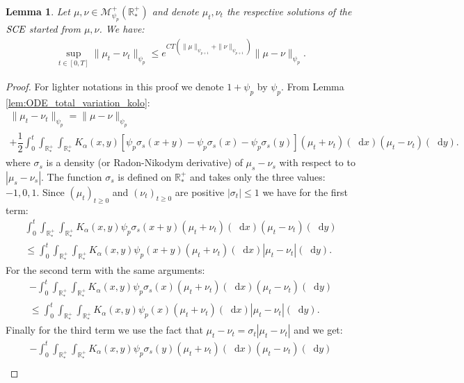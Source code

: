 \documentclass[11pt,a4paper]{article}
\newcommand{\RRP}{\mathbb{R}^+_*}
\newcommand{\MC}{\mathcal{M}}
\newcommand{\SCE}{\emph{SCE}}
\newcommand{\Proc}[1]{\left(#1\right)_{t\geq 0}}
\newcommand{\dd}{\mathop{}\!\mathrm{d}}
\newtheorem{lemma}[theorem]{Lemma}
\begin{document}
\begin{lemma}\label{lem:Lip-smol-TV}
    Let $\mu,\nu \in \MC^+_{\psi_p}(\RRP)$ and denote $\mu_t,\nu_t$ the respective solutions of the $\SCE$ started from $\mu,\nu$. We have:
    \begin{align*}
        \sup\limits_{t \in [0,T]}\| \mu_t - \nu_t\|_{\psi_p} \leq e^{CT\left(\|\mu\|_{\psi_{p+1}} + \|\nu\|_{\psi_{p+1}}\right)}\|\mu- \nu\|_{\psi_p}.
    \end{align*}
\end{lemma}
\begin{proof}
    For lighter notations in this proof we denote $1 + \psi_p$ by $\psi_p$. From Lemma \ref{lem:ODE_total_variation_kolo}:
    \begin{multline*}
        \| \mu_t - \nu_t\|_{\psi_p} = \|\mu- \nu\|_{\psi_p} \\
        + \dfrac12\int_0^t \int_{\RRP}\int_{\RRP} K_\alpha(x,y) \left[\psi_p\sigma_s(x+y) - \psi_p\sigma_s(x) - \psi_p\sigma_s(y) \right]\left(\mu_t + \nu_t\right)(\dd x) \left(\mu_t - \nu_t\right)(\dd y).
    \end{multline*}
    where $\sigma_s$ is a density (or Radon-Nikodym derivative) of $\mu_s - \nu_s$ with respect to to $|\mu_s - \nu_s|$. The function $\sigma_s$ is defined on $\RRP$ and takes only the three values: $-1,0,1$. Since $\Proc{\mu_t}$ and $\Proc{\nu_t}$ are positive $|\sigma_t| \leq 1$ we have for the first term:
    \begin{multline*}
        \int_0^t \int_{\RRP}\int_{\RRP} K_\alpha(x,y) \psi_p\sigma_s(x+y)\left(\mu_t + \nu_t\right)(\dd x) \left(\mu_t - \nu_t\right)(\dd y) \\
        \leq \int_0^t \int_{\RRP}\int_{\RRP} K_\alpha(x,y) \psi_p(x+y)\left(\mu_t + \nu_t\right)(\dd x) \left|\mu_t - \nu_t\right|(\dd y) .
    \end{multline*}
    For the second term with the same arguments:
    \begin{multline*}
        -\int_0^t \int_{\RRP}\int_{\RRP} K_\alpha(x,y) \psi_p\sigma_s(x)\left(\mu_t + \nu_t\right)(\dd x) \left(\mu_t - \nu_t\right)(\dd y) \\
        \leq \int_0^t \int_{\RRP}\int_{\RRP} K_\alpha(x,y) \psi_p(x)\left(\mu_t + \nu_t\right)(\dd x) \left|\mu_t - \nu_t\right|(\dd y).
    \end{multline*}
    Finally for the third term we use the fact that $\mu_t - \nu_t = \sigma_t\left| \mu_t - \nu_t \right|$ and we get:
    \begin{multline*}
        -\int_0^t \int_{\RRP}\int_{\RRP} K_\alpha(x,y) \psi_p\sigma_s(y)\left(\mu_t + \nu_t\right)(\dd x) \left(\mu_t - \nu_t\right)(\dd y) \\

\end{multline*}
\end{proof}
\end{document}
